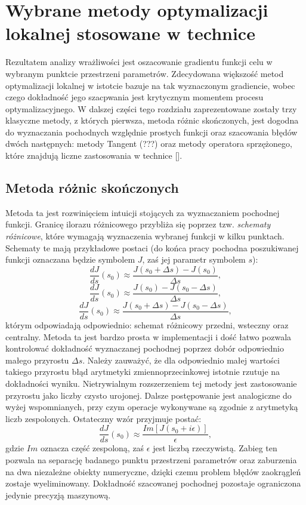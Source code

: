 \documentclass[12pt]{article}
\begin{document}
\section{Wybrane metody optymalizacji lokalnej stosowane w technice}
Rezultatem analizy wrażliwości jest oszacowanie gradientu funkcji celu w wybranym punktcie przestrzeni parametrów. Zdecydowana większość metod optymalizacji lokalnej w istotcie bazuje na tak wyznaczonym gradiencie, wobec czego dokładność jego szacpwania jest krytycznym momentem procesu optymalizacyjnego. W dalszej części tego rozdziału zaprezentowane zostały trzy klasyczne metody, z których pierwsza, metoda różnic skończonych, jest dogodna do wyznaczania pochodnych względnie prostych funkcji oraz szacowania błędów dwóch następnych: metody Tangent (???) oraz metody operatora sprzężonego, które znajdują liczne zastosowania w technice [].
\subsection{Metoda różnic skończonych}
Metoda ta jest rozwinięciem intuicji stojących za wyznaczaniem pochodnej funkcji. Granicę ilorazu różnicowego przybliża się poprzez tzw. \textit{schematy różnicowe}, które wymagają wyznaczenia wybranej funkcji w kilku punktach. Schematy te mają przykładowe postaci (do końca pracy pochodna poszukiwanej funkcji oznaczana będzie symbolem $ J $, zaś jej parametr symbolem $ s $):
\begin{equation}
\frac{dJ}{ds}(s_{0}) \approx \frac{J(s_{0}+\Delta s) - J(s_{0})}{\Delta s},
\end{equation} 
\begin{equation}
\frac{dJ}{ds}(s_{0}) \approx \frac{J(s_{0}) - J(s_{0}-\Delta s)}{\Delta s},
\end{equation} 
\begin{equation}
\frac{dJ}{ds}(s_{0}) \approx \frac{J(s_{0}+\Delta s) - J(s_{0}-\Delta s)}{\Delta s},
\end{equation}
którym odpowiadają odpowiednio: schemat różnicowy przedni, wsteczny oraz centralny. \newline
Metoda ta jest bardzo prosta w implementacji i dość łatwo pozwala kontrolować dokładność wyznaczanej pochodnej poprzez dobór odpowiednio małego przyrostu $ \Delta s  $. Należy zauważyć, że dla odpowiednio małej wartości takiego przyrostu błąd arytmetyki zmiennoprzecinkowej istotnie rzutuje na dokładności wyniku. Nietrywialnym rozszerzeniem tej metody jest zastosowanie przyrostu jako liczby czysto urojonej. Dalsze postępowanie jest analogiczne do wyżej wspomnianych, przy czym operacje wykonywane są zgodnie z arytmetyką liczb zespolonych. Ostateczny wzór przyjmuje postać:
\begin{equation}
\frac{dJ}{ds}(s_{0}) \approx \frac{Im[J(s_{0}+i\epsilon)]}{\epsilon},
\end{equation}
gdzie $ Im $ oznacza część zespoloną, zaś $\epsilon$ jest liczbą rzeczywistą. Zabieg ten pozwala na separację badanego punktu przestrzeni parametrów oraz zaburzenia na dwa niezależne obiekty numeryczne, dzięki czemu problem błędów zaokrągleń zostaje wyeliminowany. Dokładność szacowanej pochodnej pozostaje ograniczona jedynie precyzją maszynową.
\end{document}
